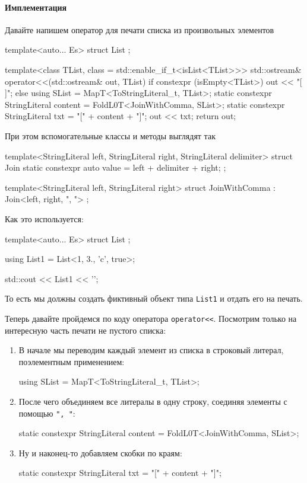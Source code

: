 \paragraph{Имплементация}

Давайте напишем оператор для печати списка из произвольных элементов
\begin{cppcode}
template<auto... Es>
struct List {};

template<class TList, class = std::enable_if_t<isList<TList>>>
std::ostream& operator<<(std::ostream& out, TList) {
  if constexpr (isEmpty<TList>) {
    out << "[ ]";
  } else {
    using SList = MapT<ToStringLiteral_t, TList>;
    static constexpr StringLiteral content =
        FoldL0T<JoinWithComma, SList>;
    static constexpr StringLiteral txt = "[" + content + "]";
    out << txt;
  }
  return out;
}
\end{cppcode}
При этом вспомогательные классы и методы выглядят так
\begin{cppcode}
template<StringLiteral left, StringLiteral right, StringLiteral delimiter>
struct Join {
  static constexpr auto value = left + delimiter + right;
};

template<StringLiteral left, StringLiteral right>
struct JoinWithComma : Join<left, right, ", "> {};
\end{cppcode}
Как это используется:
\begin{cppcode}
template<auto... Es>
struct List {};

using List1 = List<1, 3., 'c', true>;

std::cout << List1{} << '\n';
\end{cppcode}
То есть мы должны создать фиктивный объект типа \verb"List1" и отдать его на печать.

Теперь давайте пройдемся по коду оператора \verb"operator<<".
Посмотрим только на интересную часть печати не пустого списка:
\begin{enumerate}
\item В начале мы переводим каждый элемент из списка в строковый литерал, поэлементным применением:
\begin{cppcode}
using SList = MapT<ToStringLiteral_t, TList>;
\end{cppcode}

\item После чего объединяем все литералы в одну строку, соединяя элементы с помощью \verb$", "$:
\begin{cppcode}
static constexpr StringLiteral content = FoldL0T<JoinWithComma, SList>;
\end{cppcode}

\item Ну и наконец-то добавляем скобки по краям:
\begin{cppcode}
static constexpr StringLiteral txt = "[" + content + "]";
\end{cppcode}
\end{enumerate}

